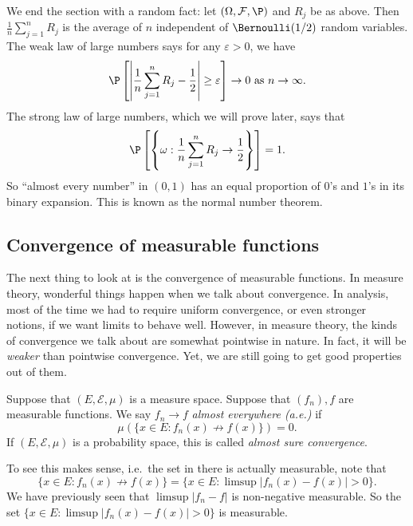 \documentclass[a4paper]{article}
\begin{document}
We end the section with a random fact: let $(\Omega, \mathcal{F}, \P)$ and $R_j$ be as above. Then $\frac{1}{n} \sum_{j = 1}^n R_j$ is the average of $n$ independent of $\Bernoulli(1/2)$ random variables. The weak law of large numbers says for any $\varepsilon > 0$, we have
\[
  \P\left[\left\lvert\frac{1}{n} \sum_{j = 1}^n R_j - \frac{1}{2}\right\rvert \geq \varepsilon\right] \to 0\text{ as }n\to \infty.
\]
The strong law of large numbers, which we will prove later, says that
\[
  \P\left[\left\{\omega: \frac{1}{n} \sum_{j = 1}^n R_j \to \frac{1}{2}\right\}\right] = 1.
\]
So ``almost every number'' in $(0, 1)$ has an equal proportion of $0$'s and $1$'s in its binary expansion. This is known as the normal number theorem.

\subsection{Convergence of measurable functions}
The next thing to look at is the convergence of measurable functions. In measure theory, wonderful things happen when we talk about convergence. In analysis, most of the time we had to require uniform convergence, or even stronger notions, if we want limits to behave well. However, in measure theory, the kinds of convergence we talk about are somewhat pointwise in nature. In fact, it will be \emph{weaker} than pointwise convergence. Yet, we are still going to get good properties out of them.

\begin{defi}
  Suppose that $(E, \mathcal{E}, \mu)$ is a measure space. Suppose that $(f_n), f$ are measurable functions. We say $f_n \to f$ \emph{almost everywhere (a.e.)} if
  \[
    \mu(\{x \in E: f_n(x) \not\to f(x)\}) = 0.
  \]
  If $(E, \mathcal{E}, \mu)$ is a probability space, this is called \emph{almost sure convergence}.
\end{defi}
To see this makes sense, i.e.\ the set in there is actually measurable, note that
\[
  \{x \in E: f_n(x) \not\to f(x)\} = \{x \in E: \limsup |f_n(x) - f(x)| > 0\}.
\]
We have previously seen that $\limsup |f_n - f|$ is non-negative measurable. So the set $\{x \in E: \limsup |f_n(x) - f(x)| > 0\}$ is measurable.
\end{document}
